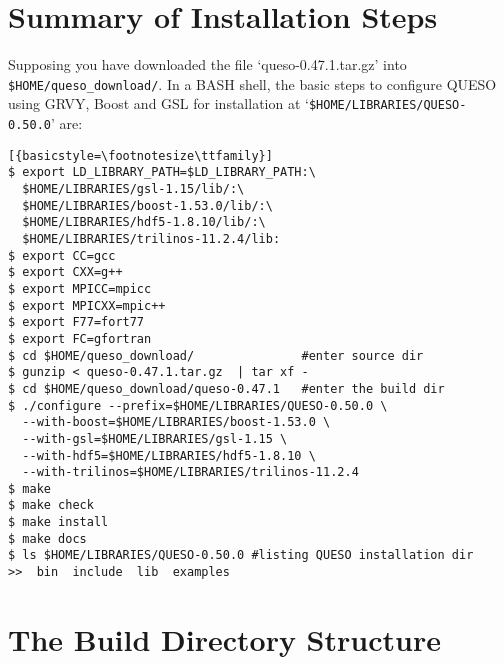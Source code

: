 \section{Summary of Installation Steps}\label{sec:summary}


Supposing you have downloaded the file `queso-0.47.1.tar.gz' into \texttt{\$HOME/queso\_download/}.
%
In a BASH shell, the basic steps to configure QUESO using GRVY, Boost and GSL for installation at 
`\verb+$HOME/LIBRARIES/QUESO-0.50.0+'  are:

\begin{lstlisting}[{basicstyle=\footnotesize\ttfamily}]
$ export LD_LIBRARY_PATH=$LD_LIBRARY_PATH:\
  $HOME/LIBRARIES/gsl-1.15/lib/:\
  $HOME/LIBRARIES/boost-1.53.0/lib/:\
  $HOME/LIBRARIES/hdf5-1.8.10/lib/:\
  $HOME/LIBRARIES/trilinos-11.2.4/lib:
$ export CC=gcc
$ export CXX=g++
$ export MPICC=mpicc
$ export MPICXX=mpic++
$ export F77=fort77
$ export FC=gfortran
$ cd $HOME/queso_download/               #enter source dir
$ gunzip < queso-0.47.1.tar.gz  | tar xf -
$ cd $HOME/queso_download/queso-0.47.1   #enter the build dir
$ ./configure --prefix=$HOME/LIBRARIES/QUESO-0.50.0 \
  --with-boost=$HOME/LIBRARIES/boost-1.53.0 \
  --with-gsl=$HOME/LIBRARIES/gsl-1.15 \
  --with-hdf5=$HOME/LIBRARIES/hdf5-1.8.10 \
  --with-trilinos=$HOME/LIBRARIES/trilinos-11.2.4
$ make 
$ make check
$ make install 
$ make docs
$ ls $HOME/LIBRARIES/QUESO-0.50.0 #listing QUESO installation dir
>>  bin  include  lib  examples
\end{lstlisting}

% 
% 


\section{The Build Directory Structure} \label{sc-source-dir-structure}


